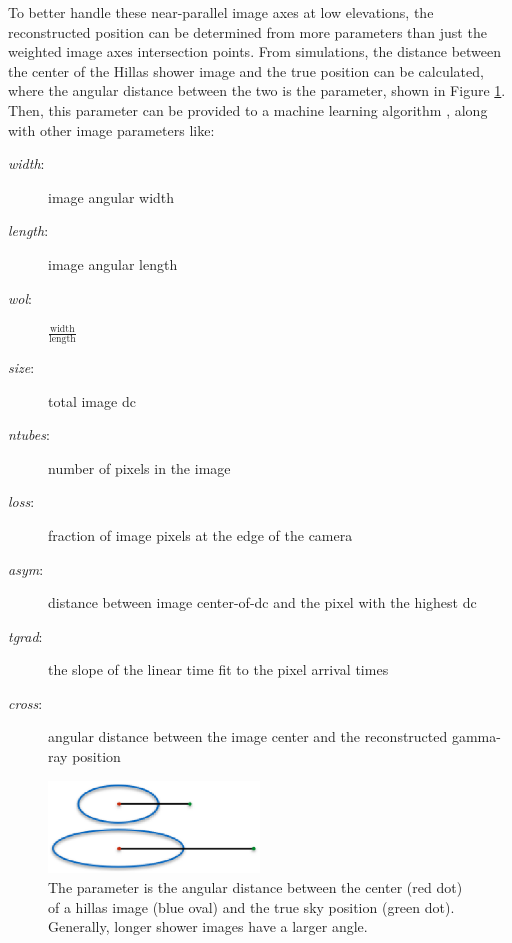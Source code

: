     To better handle these near-parallel image axes at low elevations, the reconstructed position can be determined from more parameters than just the weighted image axes intersection points.
    From simulations, the distance between the center of the Hillas shower image and the true position can be calculated, where the angular distance between the two is the \disp{} parameter\cite{Senturk:2011}, shown in Figure \ref{fig:dispdiagram}.
    Then, this \disp{} parameter can be provided to a machine learning algorithm \cite{Beilicke2012NIM}, along with other image parameters like:
    \begin{description}
      \item[\textit{width}:] image angular width
      \item[\textit{length}:] image angular length
      \item[\textit{wol}:] $\frac{\textrm{width}}{\textrm{length}}$
      \item[\textit{size}:] total image dc
      \item[\textit{ntubes}:] number of pixels in the image
      \item[\textit{loss}:] fraction of image pixels at the edge of the camera
      \item[\textit{asym}:] distance between image center-of-dc and the pixel with the highest dc
      \item[\textit{tgrad}:] the slope of the linear time fit to the pixel arrival times
      \item[\textit{cross}:] angular distance between the image center and the reconstructed gamma-ray position
    \end{description}


    \begin{figure}[ht]
      \centering
      \includegraphics[width=0.5\textwidth]{images/disp_parameter_cropped.eps}
      \caption[Angular Reconstruction Disp]{
        The \disp{} parameter is the angular distance between the center (red dot) of a hillas image (blue oval) and the true sky position (green dot).
        Generally, longer shower images have a larger \disp{} angle.
      }
      \label{fig:dispdiagram}
    \end{figure}

